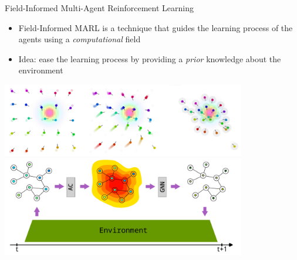 \documentclass[presentation, 8pt]{beamer}\mode<presentation>{\usetheme{AMSBolognaFC}}
\begin{document}
	\begin{frame}{Field-Informed Multi-Agent Reinforcement Learning}
		\begin{itemize}
			\item Field-Informed MARL is a technique that guides the learning process of the agents using a \emph{computational} field
			\item Idea: ease the learning process by providing a \emph{prior} knowledge about the environment
		\end{itemize}
		\centering
		\includegraphics[width=0.8\textwidth]{img/field-informed.png}
		\centering
		\includegraphics[width=0.8\textwidth]{img/field-informed-schema.png}
	\end{frame}
\end{document}
